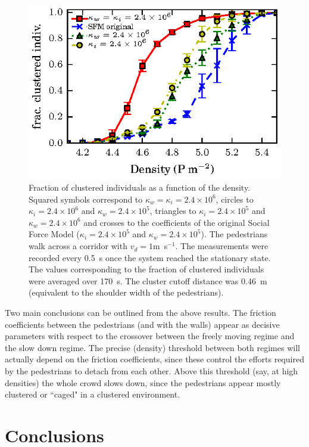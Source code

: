 \documentclass[preprint,12pt]{elsarticle}
\begin{document}
\begin{figure}[htbp!]
\centering
\includegraphics[width=0.7\columnwidth]
{./fracc_clusteriz_vs_density.eps}
\caption{\label{fic} Fraction of clustered individuals as a function of the density. Squared symbols correspond to $\kappa_w=\kappa_i=2.4\times 10^6$, circles to $\kappa_i=2.4\times 10^6$ and $\kappa_w=2.4\times 10^5$, triangles to $\kappa_i=2.4\times 10^5$ and $\kappa_w=2.4\times 10^6$ and crosses to the coefficients of the original Social Force Model ($\kappa_i=2.4\times 10^5$ and $\kappa_w=2.4\times 10^5$). The pedestrians walk across a corridor with $v_d=1$m~s$^{-1}$. The measurements were recorded every 0.5~s once the system reached the stationary state. The values corresponding to the fraction of clustered individuals were averaged over 170~s. The cluster cutoff distance was 0.46~m (equivalent to the shoulder width of the pedestrians).}
\end{figure}

Two main conclusions can be outlined from the above
results. The friction coefficients between the pedestrians
(and with the walls) appear as decisive parameters
with respect to the crossover between the freely moving
regime and the slow down regime. The precise (density) threshold between both regimes will actually depend on
the friction coefficients, since these control the efforts
required by the pedestrians to detach from each other.
Above this threshold (say, at high densities) the whole
crowd slows down, since the pedestrians appear mostly
clustered or ``caged" in a clustered environment.\\

\section{\label{conclusions}Conclusions}
\end{document}

